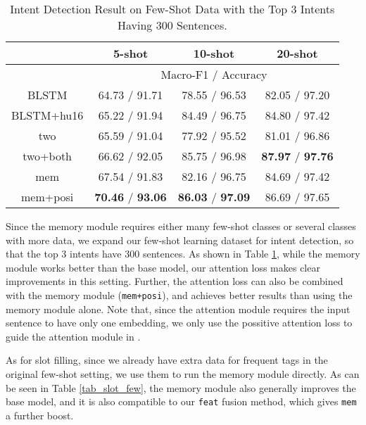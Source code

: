 \begin{table}
\setlength{\tabcolsep}{0.23em}
\centering
\small{
\begin{tabular}{|c|c|c|c|}

\hline
  & \multicolumn{1}{|c|}{5-shot} & \multicolumn{1}{|c|}{10-shot} & \multicolumn{1}{|c|}{20-shot}  \\
 \hline
  & \multicolumn{3}{|c|}{Macro-F1 / Accuracy}   \\
\hline
BLSTM & 64.73 / 91.71 & 78.55 / 96.53 & 82.05 / 97.20 \\
\hline
BLSTM+hu16 & 65.22 / 91.94 & 84.49 / 96.75 & 84.80 / 97.42 \\
\hline
two & 65.59 / 91.04 & 77.92 / 95.52 & 81.01 / 96.86 \\
\hline
two+both & 66.62 / 92.05 & 85.75 / 96.98 & \textbf{87.97} / \textbf{97.76} \\
\hline
mem & 67.54 / 91.83 & 82.16 / 96.75 & 84.69 / 97.42 \\
\hline
mem+posi & \textbf{70.46} / \textbf{93.06} & \textbf{86.03} / \textbf{97.09} & 86.69 / 97.65 \\
\hline

\end{tabular}
}
\caption{Intent Detection Result on Few-Shot Data with the Top 3 Intents Having 300 Sentences.}
\label{tab_intent_few_fill}
\end{table}

Since the memory module requires either many few-shot classes or several classes with more data, we expand our few-shot learning dataset for intent detection, so that the top 3 intents have 300 sentences. As shown in Table \ref{tab_intent_few_fill}, while the memory module works better than the base model, our attention loss makes clear improvements in this setting. Further, the attention loss can also be combined with the memory module (\texttt{mem+posi}), and achieves better results than using the memory module alone. Note that, since the attention module requires the input sentence to have only one embedding, we only use the possitive attention loss to guide the attention module in \BLSTM.

As for slot filling, since we already have extra data for frequent tags in the original few-shot setting, we use them to run the memory module directly. As can be seen in Table \ref{tab_slot_few}, the memory module also generally improves the base model, and it is also compatible to our \texttt{feat} fusion method, which gives \texttt{mem} a further boost.

